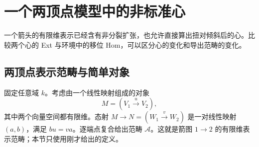 
\section{一个两顶点模型中的非标准心}
\label{b4:sec:1905}

一个箭头的有限维表示已经含有非分裂扩张，也允许直接算出扭对倾斜后的心。比较两个心的 Ext 与环境中的移位 Hom，可以区分心的变化和导出范畴的变化。


%
%

\subsection{两顶点表示范畴与简单对象}
\label{b4:subsec:1905:01}

固定任意域 \(k\)。考虑由一个线性映射组成的对象
\[
 M=(V_1\xrightarrow{u}V_2),
\]
其中两个向量空间都有限维。态射 \(M\to N=(W_1\xrightarrow{v}W_2)\) 是一对线性映射 \((a,b)\)，满足 \(bu=va\)。逐端点复合给出范畴 \(\mathcal A\)。这就是箭图 \(1\to2\) 的有限维表示范畴；本节只使用刚才给出的定义。

